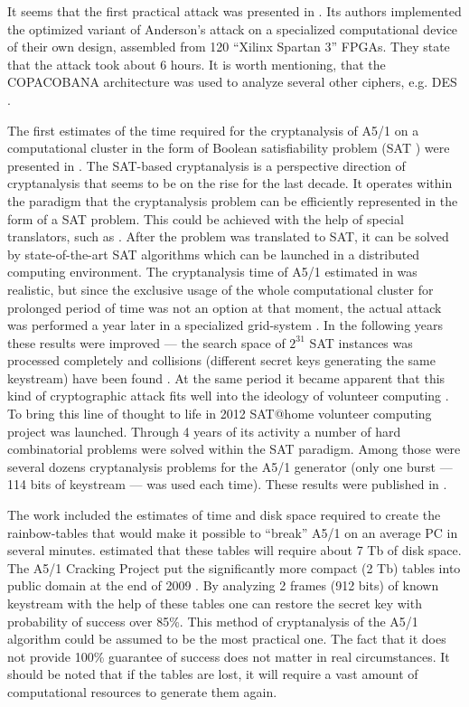 \documentclass[runningheads,a4paper]{llncs}[2015/06/24]
\begin{document}
It seems that the first practical attack was presented in \cite{DBLP:conf/ches/GendrullisNR08}. Its authors implemented the optimized variant of Anderson's attack on a specialized computational device of their
own design, assembled from 120 ``Xilinx Spartan 3'' FPGAs. They state that the attack took about 6 hours. It is worth
mentioning, that the COPACOBANA architecture was used to analyze several other ciphers, e.g. DES \cite{Guneysu2008}.

The first estimates of the time required for the cryptanalysis of A5/1 on a
computational cluster in the form of Boolean satisfiability problem (SAT \cite{DBLP:series/faia/2009-185})
were presented in \cite{PACO-2008}. The SAT-based cryptanalysis is
a perspective direction of cryptanalysis that seems to be on the rise for the last decade. It operates within the paradigm that the cryptanalysis problem can be efficiently represented in the form of a SAT
problem. This could be achieved with the help of special translators, such as
\cite{DBLP:conf/csiirw/ErkokM09,journals/lmcs/predrag,DBLP:conf/ecai/OtpuschennikovS16}. After the problem was translated
to SAT, it can be solved by state-of-the-art SAT algorithms which can
be launched in a distributed computing environment. The cryptanalysis time of A5/1
estimated in \cite{PACO-2008} was realistic, but since the exclusive usage of
the whole computational cluster for prolonged period of time was not an option at that moment,
the actual attack was performed a year later in a specialized grid-system
\cite{Posypkin2009}. In the following years these results were improved --- the
search space of $2^{31}$ SAT instances was processed completely and collisions
(different secret keys generating the same keystream) have been found
\cite{DBLP:conf/pact/SemenovZBP11}. At the same period it became apparent that 
this kind of cryptographic attack fits well into the ideology
of volunteer computing \cite{DBLP:conf/ccgrid/AndersonF06}. To bring this line of
thought to life in 2012 SAT@home \cite{Semenov2016} volunteer computing project
was launched. Through 4 years of its activity a number of hard combinatorial
problems were solved within the SAT paradigm. Among those were several dozens
cryptanalysis problems for the A5/1 generator (only one burst --- 114 bits of
keystream --- was used each time). These results were published in
\cite{DBLP:conf/pact/SemenovZ15,Semenov2016}.

The work \cite{Guneysu2008} included the estimates of time and disk space
required to create the rainbow-tables that would make it possible to
``break'' A5/1 on an average PC in several minutes. \cite{Guneysu2008} estimated
that these tables will require about 7 Tb of disk space. The A5/1 Cracking Project put the
significantly more compact (2 Tb) tables into public domain at the end of 2009
\cite{Nohl2010}. By analyzing 2 frames (912 bits) of known keystream with
the help of these tables one can restore the secret key with probability of
success over 85\%. This method of cryptanalysis of the A5/1 algorithm could be
assumed to be the most practical one. The fact that it does not provide 100\%
guarantee of success does not matter in real circumstances. It should be noted that if the tables are lost, it will require a
vast amount of computational resources to generate them again.
\end{document}
